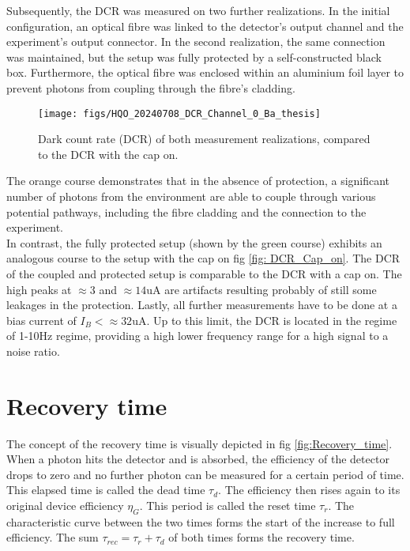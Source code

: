 Subsequently, the DCR was measured on two further realizations.
In the initial configuration, an optical fibre was linked to the detector's output channel and the experiment's output connector.
In the second realization, the same connection was maintained, but the setup was fully protected by a self-constructed black box.
Furthermore, the optical fibre was enclosed within an aluminium foil layer to prevent photons from coupling through the fibre's cladding.

\begin{figure}[H]
 \centering
 \texttt{[image: figs/HQO\_20240708\_DCR\_Channel\_0\_Ba\_thesis]}
 \caption{Dark count rate (DCR) of both measurement realizations, compared to the DCR with the cap on.}
 \label{fig: DCR_black_box_to_exp}
\end{figure}

The orange course demonstrates that in the absence of protection, a significant number of photons from the environment
are able to couple through various potential pathways, including the fibre cladding and the connection to the experiment.\\
In contrast, the fully protected setup (shown by the green course) exhibits an analogous course to the setup with the cap
on fig \ref{fig: DCR_Cap_on}.
The DCR of the coupled and protected setup is comparable to the DCR with a cap on.
The high peaks at $\approx 3$ and $\approx 14$uA are artifacts resulting probably of still some leakages in the protection.
Lastly, all further measurements have to be done at a bias current of $ I_B < \approx 32$uA.
Up to this limit, the DCR is located in the regime of 1-10Hz regime, providing a high lower frequency range for a high
signal to a noise ratio.

\section{Recovery time}\label{sec:recovery-time}
The concept of the recovery time is visually depicted in fig \ref{fig:Recovery_time}.
When a photon hits the detector and is absorbed, the efficiency of the detector drops to zero and no further photon can
be measured for a certain period of time.
This elapsed time is called the dead time $\tau_{d}$.
The efficiency then rises again to its original device efficiency $\eta_{G}$.
This period is called the reset time $\tau_{r}$.
The characteristic curve between the two times forms the start of the increase to full efficiency.
The sum $\tau_{rec} = \tau_{r} + \tau_{d}$ of both times forms the recovery time.

